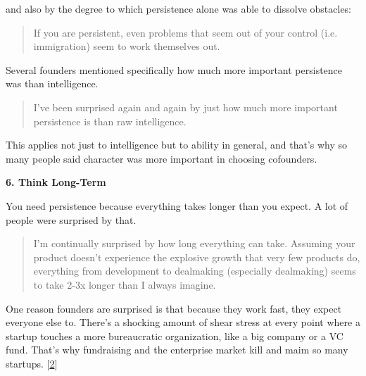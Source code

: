                   and also by the degree to which persistence alone was able to
                  dissolve obstacles:
                  \begin{quote}

                    If you are persistent, even problems that seem out of your
                    control (i.e. immigration) seem to work themselves out.
                  
\end{quote}

                  Several founders mentioned specifically how much more
                  important persistence was than intelligence.
                  \begin{quote}

                    I've been surprised again and again by just how much more
                    important persistence is than raw intelligence.
                  
\end{quote}

                  This applies not just to intelligence but to ability in
                  general, and that's why so many people said character was more
                  important in choosing cofounders.


                  \textbf{6. Think Long-Term}

You need persistence
                  because everything takes longer than you expect. A lot of
                  people were surprised by that.
                  \begin{quote}

                    I'm continually surprised by how long everything can take.
                    Assuming your product doesn't experience the explosive
                    growth that very few products do, everything from
                    development to dealmaking (especially dealmaking) seems to
                    take 2-3x longer than I always imagine.
                  
\end{quote}

                  One reason founders are surprised is that because they work
                  fast, they expect everyone else to. There's a shocking amount
                  of shear stress at every point where a startup touches a more
                  bureaucratic organization, like a big company or a VC fund.
                  That's why fundraising and the enterprise market kill and maim
                  so many startups.
                  [\href{\#f2n}{2}]

